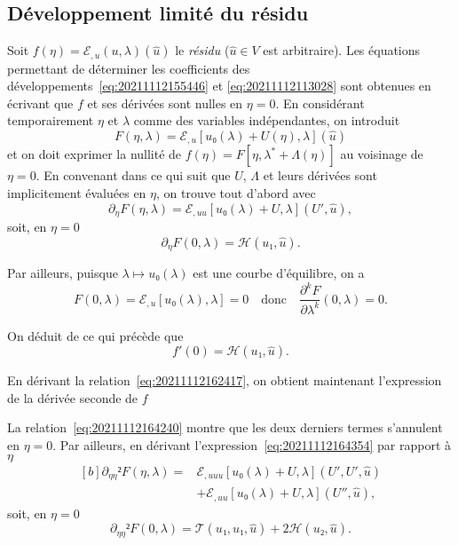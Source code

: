\documentclass[12pt, final]{amsart}
\begin{document}
\subsection{Développement limité du résidu}
\label{sec:20211112182000}

Soit \(f(η)=ℰ_{,u}(u, \lambda)(\hat{u})\) le \emph{résidu}
(\(\hat{u}∈ V\) est arbitraire). Les équations permettant de déterminer les
coefficients des développements~\eqref{eq:20211112155446} et
\eqref{eq:20211112113028} sont obtenues en écrivant que \(f\) et ses dérivées
sont nulles en \(η=0\). En considérant temporairement \(η\) et
\(\lambda\) comme des variables indépendantes, on introduit
\begin{equation}
  F(η, \lambda)=ℰ_{,u}[u₀(\lambda)+U(η), \lambda](\hat{u})
\end{equation}
et on doit exprimer la nullité de
\(f(η)=F[η, \lambda^\ast+\Lambda(η)]\) au voisinage de \(η=0\). En
convenant dans ce qui suit que \(U\), \(\Lambda\) et leurs dérivées sont
implicitement évaluées en \(η\), on trouve tout d'abord
avec
\begin{equation}
  \label{eq:20211112164354}
  \partial_η F(η, \lambda)
  =ℰ_{,uu}[u₀(\lambda)+U, \lambda](U', \hat{u}),
\end{equation}
soit, en \(η=0\)
\begin{equation}
  \label{eq:20211112165323}
  \partial_η F(0, \lambda)=ℋ(u₁, \hat{u}).
\end{equation}

Par ailleurs, puisque \(\lambda\mapsto u₀(\lambda)\) est une courbe d'équilibre, on a
\begin{equation}
  \label{eq:20211112164240}
  F(0, \lambda)=ℰ_{,u}[u₀(\lambda), \lambda]=0
  \quad\text{donc}\quad
  \frac{\partial^kF}{\partial\lambda^k}(0, \lambda)=0.
\end{equation}

On déduit de ce qui précède que
\begin{equation}
  \label{eq:20211112182300}
  f'(0)=ℋ(u₁, \hat{u}).
\end{equation}

En dérivant la relation~\eqref{eq:20211112162417}, on obtient maintenant l'expression de la dérivée seconde de \(f\)

La relation~\eqref{eq:20211112164240} montre que les deux derniers termes
s'annulent en \(η=0\). Par ailleurs, en dérivant
l'expression~\eqref{eq:20211112164354} par rapport à \(η\)
\begin{equation}
  \label{eq:20211112172446}
  \begin{aligned}[b]
    \partial_{ηη}²F(η, \lambda)={}&
    ℰ_{,uuu}[u₀(\lambda)+U, \lambda](U', U', \hat{u})\\
    &+ℰ_{,uu}[u₀(\lambda)+U, \lambda](U'', \hat{u}),
  \end{aligned}
\end{equation}
soit, en \(η=0\)
\begin{equation}
  \label{eq:20211112165830}
  \partial_{ηη}²F(0, \lambda)=\mathcal T(u₁, u₁, \hat{u})
  +2ℋ(u₂, \hat{u}).
\end{equation}
\end{document}
